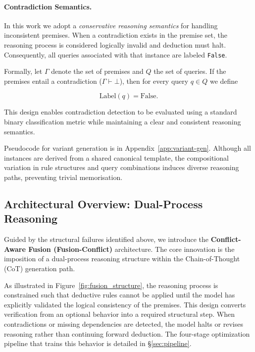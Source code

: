 \documentclass{article} %
\begin{document}
\paragraph{Contradiction Semantics.}
In this work we adopt a \textit{conservative reasoning semantics} for 
handling inconsistent premises. When a contradiction exists in the 
premise set, the reasoning process is considered logically invalid and 
deduction must halt. Consequently, all queries associated with that 
instance are labeled \texttt{False}.

Formally, let $\Gamma$ denote the set of premises and $Q$ the set of 
queries. If the premises entail a contradiction ($\Gamma \vdash \bot$), 
then for every query $q \in Q$ we define

\[
\text{Label}(q) = \text{False}.
\]

This design enables contradiction detection to be evaluated using a 
standard binary classification metric while maintaining a clear and 
consistent reasoning semantics.

Pseudocode for variant generation is in Appendix~\ref{app:variant-gen}. Although all instances are derived from a shared canonical template, the compositional variation in rule structures and query combinations induces diverse reasoning paths, preventing trivial memorisation.

\subsection{Architectural Overview: Dual-Process Reasoning}
Guided by the structural failures identified above, we introduce the \textbf{Conflict-Aware Fusion (Fusion-Conflict)} architecture. The core innovation is the imposition of a dual-process reasoning structure within the Chain-of-Thought (CoT) generation path. 

As illustrated in Figure~\ref{fig:fusion_structure}, the reasoning process is constrained such that deductive rules cannot be applied until the model has explicitly validated the logical consistency of the premises. This design converts verification from an optional behavior into a required structural step. When contradictions or missing dependencies are detected, the model halts or revises reasoning rather than continuing forward deduction. The four-stage optimization pipeline that trains this behavior is detailed in \S\ref{sec:pipeline}.
\end{document}

